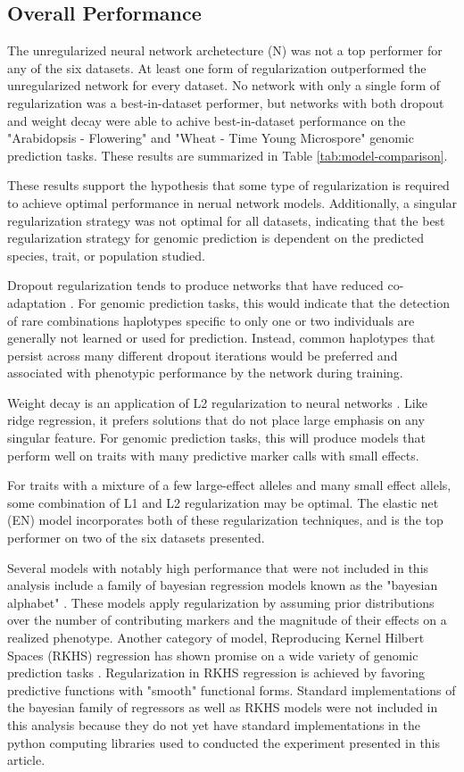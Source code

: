 
\subsection*{Overall Performance}

The unregularized neural network archetecture (N) was not a top performer for any of the six datasets. 
At least one form of regularization outperformed the unregularized network for every dataset. 
No network with only a single form of regularization was a best-in-dataset performer, but networks 
with both dropout and weight decay were able to achive best-in-dataset performance on the "Arabidopsis 
 - Flowering" and "Wheat - Time Young Microspore" genomic prediction tasks. These results are summarized 
in Table \ref{tab:model-comparison}.

These results support the hypothesis that some type of regularization is required to achieve
optimal performance in nerual network models. Additionally, a singular regularization strategy was
not optimal for all datasets, indicating that the best regularization strategy for genomic prediction
is dependent on the predicted species, trait, or population studied. 

Dropout regularization tends to produce networks 
that have reduced co-adaptation \citep{srivastava2014}. For genomic prediction tasks, this would
indicate that the detection of rare combinations haplotypes specific to only one
or two individuals are generally not learned or used for prediction. Instead, common haplotypes that persist across many
different dropout iterations would be preferred and associated with phenotypic performance by the network during training.

Weight decay is an application of L2 regularization to neural networks \citep{krogh1992}. Like ridge regression, it prefers
solutions that do not place large emphasis on any singular feature. For genomic prediction tasks, 
this will produce models that perform well on traits with many predictive marker calls 
with small effects. 

For traits with a mixture of a few large-effect alleles and many small effect allels, some combination of 
L1 and L2 regularization may be optimal. The elastic net (EN) model incorporates both of these regularization
techniques, and is the top performer on two of the six datasets presented.

Several models with notably high performance that were not included in this analysis include a
family of bayesian regression models known as the "bayesian alphabet" \citep{gianola2009}. These
models apply regularization by assuming prior distributions over the number of contributing markers
and the magnitude of their effects on a realized phenotype. Another category of model, Reproducing 
Kernel Hilbert Spaces (RKHS) regression has shown promise on a wide variety of genomic 
prediction tasks \citep{heslot2012, gianola2008}. Regularization in RKHS regression is achieved
by favoring predictive functions with "smooth" functional forms. Standard implementations
of the bayesian family of regressors as well as RKHS models were not included in this analysis
because they do not yet have standard implementations in the python computing libraries used 
to conducted the experiment presented in this article.

